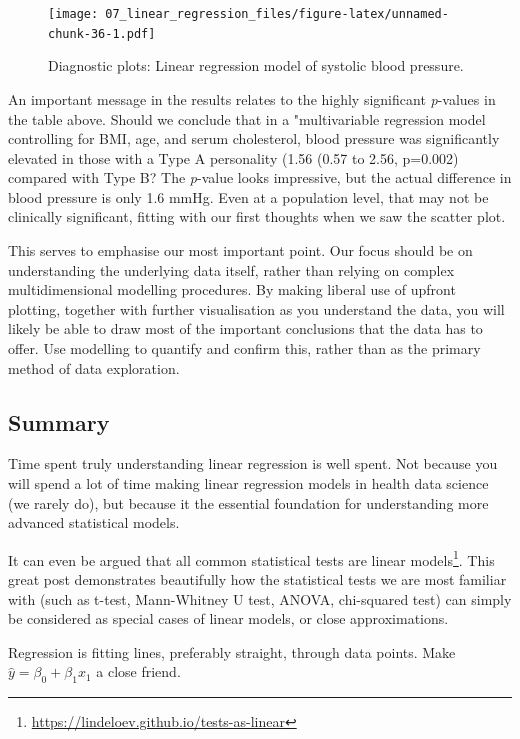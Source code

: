 \documentclass[
  12pt,
  krantz2]{krantz}
\renewcommand{\href}[2]{#2\footnote{\url{#1}}}
\begin{document}
\begin{figure}
\centering
\texttt{[image: 07\_linear\_regression\_files/figure-latex/unnamed-chunk-36-1.pdf]}
\caption{\label{fig:unnamed-chunk-36}Diagnostic plots: Linear regression model of systolic blood pressure.}
\end{figure}

An important message in the results relates to the highly significant \emph{p}-values in the table above.
Should we conclude that in a "multivariable regression model controlling for BMI, age, and serum cholesterol, blood pressure was significantly elevated in those with a Type A personality (1.56 (0.57 to 2.56, p=0.002) compared with Type B?
The \emph{p}-value looks impressive, but the actual difference in blood pressure is only 1.6 mmHg.
Even at a population level, that may not be clinically significant, fitting with our first thoughts when we saw the scatter plot.

This serves to emphasise our most important point.
Our focus should be on understanding the underlying data itself, rather than relying on complex multidimensional modelling procedures.
By making liberal use of upfront plotting, together with further visualisation as you understand the data, you will likely be able to draw most of the important conclusions that the data has to offer.
Use modelling to quantify and confirm this, rather than as the primary method of data exploration.

\hypertarget{summary-1}{%
\subsection{Summary}\label{summary-1}}

Time spent truly understanding linear regression is well spent.
Not because you will spend a lot of time making linear regression models in health data science (we rarely do), but because it the essential foundation for understanding more advanced statistical models.

It can even be argued that all \href{https://lindeloev.github.io/tests-as-linear}{common statistical tests are linear models}.
This great post demonstrates beautifully how the statistical tests we are most familiar with (such as t-test, Mann-Whitney U test, ANOVA, chi-squared test) can simply be considered as special cases of linear models, or close approximations.

Regression is fitting lines, preferably straight, through data points.
Make \(\hat{y} = \beta_0 + \beta_1 x_1\) a close friend.
\end{document}
